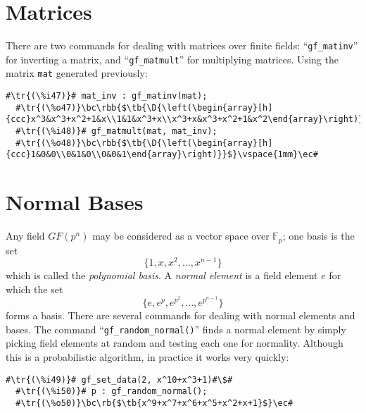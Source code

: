 \documentclass[a4paper,11pt,leqno,fleqn]{artikel3}
\newcommand{\D}{\displaystyle}
\newcommand{\bc}{\begin{center}}
\newcommand{\ec}{\end{center}}
\newcommand{\tr}[1]{\textcolor{red}{#1}}
\newcommand{\tb}[1]{\textcolor{blue}{#1}}
\newcommand{\rb}[1]{\raisebox{2mm}[0mm][1mm]{#1}}
\newcommand{\rbb}[1]{\raisebox{-4mm}[0mm][9mm]{#1}}
\begin{document}
\section*{Matrices}

There are two commands for dealing with matrices over finite fields:
``\verb!gf_matinv!'' for inverting a matrix, and ``\verb!gf_matmult!'' for
multiplying matrices.  Using the matrix \texttt{mat} generated previously:

\vspace*{2mm}
\begin{lstlisting}[escapechar=\#]
  #\tr{(\%i47)}# mat_inv : gf_matinv(mat);
  #\tr{(\%o47)}\bc\rbb{$\tb{\D{\left(\begin{array}[h]{ccc}x^3&x^3+x^2+1&x\\1&1&x^3+x\\x^3+x&x^3+x^2+1&x^2\end{array}\right)}}$}\vspace{3mm}\ec#
  #\tr{(\%i48)}# gf_matmult(mat, mat_inv);
  #\tr{(\%o48)}\bc\rbb{$\tb{\D{\left(\begin{array}[h]{ccc}1&0&0\\0&1&0\\0&0&1\end{array}\right)}}$}\vspace{1mm}\ec#
\end{lstlisting}


\section*{Normal Bases}

Any field $GF(p^n)$ may be considered as a vector space over
$\mathbb{F}_p$; one basis is the set
\[
\{1,x,x^2,\ldots,x^{n-1}\}
\]
which is called the \emph{polynomial basis}.  A \emph{normal element} is a
field element $e$ for which the set
\[
\{e,e^p,e^{p^2},\ldots,e^{p^{n-1}}\}
\]
forms a basis.  There are several commands for dealing with normal elements
and bases.  The command ``\verb!gf_random_normal()!'' finds a normal element by
simply picking field elements at random and testing each one for normality.
Although this is a probabilistic algorithm, in practice it works very quickly:


\vspace*{2mm}
\begin{lstlisting}[escapechar=\#]
  #\tr{(\%i49)}# gf_set_data(2, x^10+x^3+1)#\$#
  #\tr{(\%i50)}# p : gf_random_normal();
  #\tr{(\%o50)}\bc\rb{$\tb{x^9+x^7+x^6+x^5+x^2+x+1}$}\ec#
\end{lstlisting}
\end{document}
